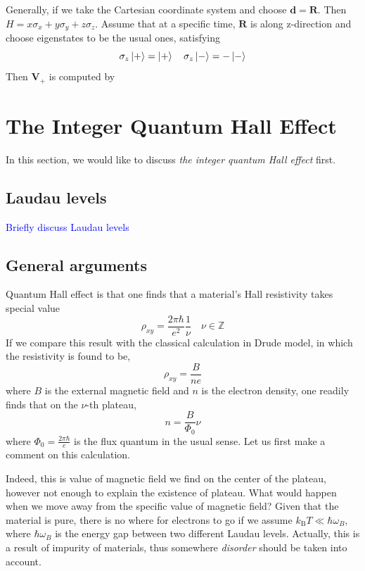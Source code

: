 \documentclass[12pt,a4paper]{article}
\numberwithin{equation}{section}
\newcommand{\kb}{k_\mathrm{B}}       %
\newcommand{\wb}{\omega_B}
\begin{document}
Generally, if we take the Cartesian coordinate system and choose $\mathbf{d} = \mathbf{R}$. Then $H = x\sigma_x+y\sigma_y+z\sigma_z$.
Assume that at a specific time, $\mathbf{R}$ is along z-direction and choose eigenstates to be the usual ones, satisfying
\begin{equation}
    \sigma_z\ket{+} = \ket{+} \quad \sigma_z\ket{-} = -\ket{-}
\end{equation}
Then $\mathbf{V}_+$ is computed by 


\section{The Integer Quantum Hall Effect}
\label{sec:IQHE}
In this section, we would like to discuss \textit{the integer quantum Hall effect} first. 

\subsection*{Laudau levels}
\textcolor{blue}{Briefly discuss Laudau levels}


\subsection{General arguments}
Quantum Hall effect is that one finds that a material's Hall resistivity takes special value
\begin{equation}
    \rho_{xy} = \frac{2\pi\hbar}{e^2} \frac{1}{\nu} \quad \nu\in \mathbb{Z}
\end{equation}
If we compare this result with the classical calculation in Drude model, in which the resistivity is found to be,
\begin{equation}
    \rho_{xy} = \frac{B}{ne}
\end{equation}
where $B$ is the external magnetic field and $n$ is the electron density, one readily finds that on the $\nu$-th plateau,
\begin{equation}
    n = \frac{B}{\Phi_0}\nu
\end{equation}
where $\Phi_0 = \frac{2\pi\hbar}{e}$ is the flux quantum in the usual sense. Let us first make a comment on this calculation.

Indeed, this is value of magnetic field we find on the center of the plateau, however not enough to explain the existence of plateau.
What would happen when we move away from the specific value of magnetic field? Given that the material is pure, there is no where for
electrons to go if we assume $\kb T \ll \hbar \wb$, where $\hbar\wb$ is the energy gap between two different Laudau levels. Actually, this
is a result of impurity of materials, thus somewhere \textit{disorder} should be taken into account.
\end{document}

